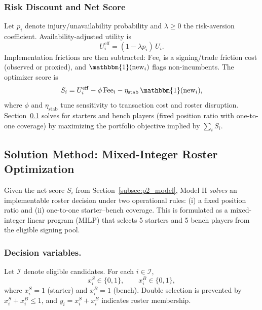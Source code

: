 \documentclass[12pt]{article}
\numberwithin{figure}{section}
\numberwithin{table}{section}
\begin{document}
	\subsubsection{Risk Discount and Net Score}\label{subsubsec:p2_net}
	Let $p_i$ denote injury/unavailability probability and $\lambda\ge 0$ the risk-aversion coefficient. Availability-adjusted utility is
	\begin{equation}\label{eq:p2_risk_discount}
		U_i^{\mathrm{eff}}=(1-\lambda p_i)\,U_i .
	\end{equation}
	Implementation frictions are then subtracted: $\mathrm{Fee}_i$ is a signing/trade friction cost (observed or proxied), and $\mathbbm{1}(\mathrm{new}_i)$ flags non-incumbents. The optimizer score is
	\begin{equation}\label{eq:p2_net_score}
		S_i=U_i^{\mathrm{eff}}-\phi\,\mathrm{Fee}_i-\eta_{\mathrm{stab}}\,\mathbbm{1}(\mathrm{new}_i),
	\end{equation}
	where $\phi$ and $\eta_{\mathrm{stab}}$ tune sensitivity to transaction cost and roster disruption. Section~\ref{subsec:p2_solution} solves for starters and bench players (fixed position ratio with one-to-one coverage) by maximizing the portfolio objective implied by $\sum_i S_i$.
	
	
	
	\subsection{Solution Method: Mixed-Integer Roster Optimization}\label{subsec:p2_solution}
	
	Given the net score $S_i$ from Section~\ref{subsec:p2_model}, Model II \emph{solves} an implementable roster decision under two operational rules: (i) a fixed position ratio and (ii) one-to-one starter--bench coverage. This is formulated as a mixed-integer linear program (MILP) that selects 5 starters and 5 bench players from the eligible signing pool.
	
	\subsubsection{Decision variables.}
	Let $\mathcal{I}$ denote eligible candidates. For each $i\in\mathcal{I}$,
	\begin{equation}\label{eq:p2_vars_key}
		x_i^{S}\in\{0,1\},\qquad x_i^{B}\in\{0,1\},
	\end{equation}
	where $x_i^{S}=1$ (starter) and $x_i^{B}=1$ (bench). Double selection is prevented by $x_i^{S}+x_i^{B}\le 1$, and $y_i=x_i^{S}+x_i^{B}$ indicates roster membership.
	
\end{document}
